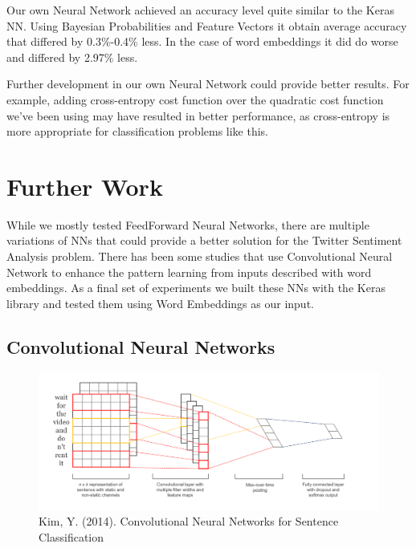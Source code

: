 \documentclass[11pt,onecolumn]{article} %
\begin{document}
	Our own Neural Network achieved an accuracy level quite similar to the Keras NN. Using Bayesian Probabilities and Feature Vectors it obtain average accuracy that differed by 0.3\%-0.4\% less. In the case of word embeddings it did do worse and differed by 2.97\% less.
	
	\par Further development in our own Neural Network could provide better results. For example, adding cross-entropy cost function over the quadratic cost function we've been using may have resulted in better performance, as cross-entropy is more appropriate for classification problems like this.
	
	
	\section{Further Work}
	
	While we mostly tested FeedForward Neural Networks, there are multiple variations of NNs that could provide a better solution for the Twitter Sentiment Analysis problem. There has been some studies \cite{tang2014learning,tang2014coooolll} that use Convolutional Neural Network to enhance the pattern learning from inputs described with word embeddings. As a final set of experiments we built these NNs with the Keras library and tested them using Word Embeddings as our input.
	
	\subsection{Convolutional Neural Networks}
	\begin{figure}
		\centering
		\includegraphics[width=1.0\linewidth]{images/cnn}
		\caption{Kim, Y. (2014). Convolutional Neural Networks for Sentence Classification}
	\end{figure}
	
\end{document}

